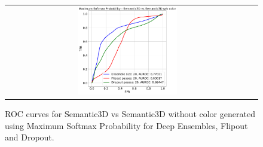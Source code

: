 \begin{figure}
\begin{tabular}{cc}
            \includegraphics[width = 0.42\textwidth, height= 0.3\textheight]{images/AUROC/MSP_cnc_20.pdf} &
            \\
        \end{tabular}
        \caption{ROC curves for Semantic3D vs Semantic3D without color generated using Maximum Softmax Probability for Deep Ensembles, Flipout and Dropout.}
        \label{fig:roc_msp_ood_2}
    \end{figure}
